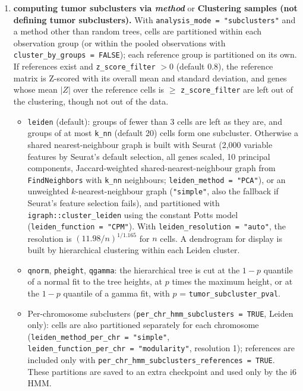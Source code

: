 \begin{enumerate}
\item[\textbf{17}] \textbf{computing tumor subclusters via \textit{method}} or \textbf{Clustering samples (not defining tumor subclusters).} With \texttt{analysis\_mode\ =\ "subclusters"} and a method other than random trees, cells are partitioned within each observation group (or within the pooled observations with \texttt{cluster\_by\_groups\ =\ FALSE}); each reference group is partitioned on its own. If references exist and \texttt{z\_score\_filter} $> 0$ (default 0.8), the reference matrix is Z-scored with its overall mean and standard deviation, and genes whose mean $|Z|$ over the reference cells is $\geq$ \texttt{z\_score\_filter} are left out of the clustering, though not out of the data.
\begin{itemize}
\tightlist
\item \texttt{leiden} (default): groups of fewer than 3 cells are left as they are, and groups of at most \texttt{k\_nn} (default 20) cells form one subcluster. Otherwise a shared nearest-neighbour graph is built with Seurat (2,000 variable features by Seurat's default selection, all genes scaled, 10 principal components, Jaccard-weighted shared-nearest-neighbour graph from \texttt{FindNeighbors} with \texttt{k\_nn} neighbours; \texttt{leiden\_method\ =\ "PCA"}), or an unweighted $k$-nearest-neighbour graph (\texttt{"simple"}, also the fallback if Seurat's feature selection fails), and partitioned with \texttt{igraph::cluster\_leiden} using the constant Potts model (\texttt{leiden\_function\ =\ "CPM"}). With \texttt{leiden\_resolution\ =\ "auto"}, the resolution is $(11.98/n)^{1/1.165}$ for $n$ cells. A dendrogram for display is built by hierarchical clustering within each Leiden cluster.
\item \texttt{qnorm}, \texttt{pheight}, \texttt{qgamma}: the hierarchical tree is cut at the $1-p$ quantile of a normal fit to the tree heights, at $p$ times the maximum height, or at the $1-p$ quantile of a gamma fit, with $p$ = \texttt{tumor\_subcluster\_pval}.
\item Per-chromosome subclusters (\texttt{per\_chr\_hmm\_subclusters\ =\ TRUE}, Leiden only): cells are also partitioned separately for each chromosome (\texttt{leiden\_method\_per\_chr\ =\ "simple"}, \texttt{leiden\_function\_per\_chr\ =\ "modularity"}, resolution 1); references are included only with \texttt{per\_chr\_hmm\_subclusters\_references\ =\ TRUE}. These partitions are saved to an extra checkpoint and used only by the i6 HMM.
\end{itemize}

\end{enumerate}
